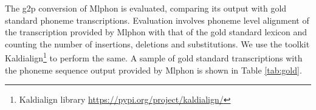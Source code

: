 The \gls{g2p} conversion of Mlphon is evaluated, comparing its output
with gold standard phoneme transcriptions. Evaluation involves phoneme level
alignment of the transcription provided by Mlphon with that of the gold
standard lexicon and counting the number of insertions, deletions and
substitutions. We use the toolkit Kaldialign\footnote{Kaldialign library
	\url{https://pypi.org/project/kaldialign/}} to perform the same. A sample of
gold standard transcriptions with the phoneme sequence output provided by
Mlphon is shown in Table \ref{tab:gold}.

